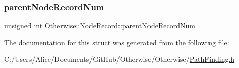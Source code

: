 \mbox{\label{struct_otherwise_1_1_node_record_aa44a35596eb628da85b1a3931e3ec3ba}} 
\subsubsection{\texorpdfstring{parent\+Node\+Record\+Num}{parentNodeRecordNum}}
{\footnotesize\ttfamily unsigned int Otherwise\+::\+Node\+Record\+::parent\+Node\+Record\+Num}



The documentation for this struct was generated from the following file\+:\begin{DoxyCompactItemize}
\item 
C\+:/\+Users/\+Alice/\+Documents/\+Git\+Hub/\+Otherwise/\+Otherwise/\hyperlink{_path_finding_8h}{Path\+Finding.\+h}\end{DoxyCompactItemize}
